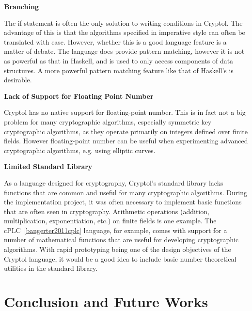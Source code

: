 \documentclass[a4paper, notitlepage]{report}
\renewcommand{\paragraph}[1]{\vspace*{1em}\noindent\textbf{#1}\hspace*{1em}}
\begin{document}
\paragraph{Branching}

The if statement is often the only solution to writing conditions in Cryptol. 
The advantage of this is that the
algorithms specified in imperative style can often be translated with ease. However,
whether this is a good language feature is a matter of debate. The language does
provide pattern matching, however it is not as powerful as that in Haskell, and is
used to only access components of data structures.
A more powerful pattern matching feature like that of Haskell's is desirable.

\paragraph{Lack of Support for Floating Point Number}

Cryptol has no native support for floating-point number. This is in fact not a big 
problem for many cryptographic algorithms, especially symmetric key cryptographic
algorithms, as they operate primarily on integers defined over finite fields. 
However floating-point number can be useful when experimenting advanced
cryptographic algorithms, e.g. using elliptic curves.

\paragraph{Limited Standard Library}

As a language designed for cryptography, Cryptol's standard library lacks functions 
that are common and useful for many cryptographic algorithms. 
During the implementation project, it was often necessary to implement basic functions
that are often seen in cryptography.
Arithmetic operations 
(addition, multiplication, exponentiation, etc.) on finite fields is one example. 
The cPLC~\ref{bangerter2011cplc} language, for example, comes with support for a number
 of mathematical functions that are useful for developing cryptographic algorithms.
With rapid prototyping being one of the design objectives of the Cryptol language, 
it would be a good idea to include basic number theoretical utilities in the 
standard library.

\newpage
\chapter{Conclusion and Future Works}
\label{chap:conclusion}
\end{document}
